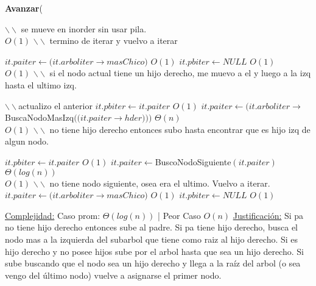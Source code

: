 \begin{algorithm}[H]{\textbf{Avanzar}(}
	\begin{algorithmic}
		\State $\backslash\backslash$ se mueve en inorder sin usar pila.
		\\

		 \Comment $O(1)$
			\State $\backslash\backslash$ termino de iterar y vuelvo a iterar

			\State $it.paiter \gets (it.arboliter$$\rightarrow$$masChico)$ \Comment $O(1)$
			\State $it.pbiter \gets NULL$ \Comment $O(1)$
			\\

		 \Comment $O(1)$
			\State $\backslash\backslash$ si el nodo actual tiene un hijo derecho, me muevo a el y luego a la izq hasta el ultimo izq.
			
			\State $\backslash\backslash$actualizo el anterior
			\State $it.pbiter \gets it.paiter$ \Comment $O(1)$
			\State $it.paiter \gets (it.arboliter$$\rightarrow$BuscaNodoMasIzq$((it.paiter$$\rightarrow$$hder)))$ \Comment $\Theta(n)$
			\\

		 \Comment $O(1)$
			\State $\backslash\backslash$ no tiene hijo derecho entonces subo hasta encontrar que es hijo izq de algun nodo.

			\State $it.pbiter \gets it.paiter$ \Comment $O(1)$
			\State $it.paiter \gets $BuscoNodoSiguiente$(it.paiter)$ \Comment $\Theta(log(n))$
			\\

			 \Comment $O(1)$
				\State $\backslash\backslash$ no tiene nodo siguiente, osea era el ultimo. Vuelvo a iterar.
				\State $it.paiter \gets (it.arboliter$$\rightarrow$$masChico)$ \Comment $O(1)$
				\State $it.pbiter \gets NULL$ \Comment $O(1)$
			\EndIf


		\EndIf

		\medskip
		\Statex \underline{Complejidad:} Caso prom: $\Theta(log(n))$ | Peor Caso $O(n)$
		\Statex \underline{Justificación:} Si pa no tiene hijo derecho entonces sube al padre. Si pa tiene hijo derecho, busca el nodo mas a la izquierda del subarbol que tiene como raiz al hijo derecho. Si es hijo derecho y no posee hijos sube por el arbol hasta que sea un hijo derecho. Si sube buscando que el nodo sea un hijo derecho y llega a la raíz del arbol (o sea vengo del último nodo) vuelve a asignarse el primer nodo.

    \end{algorithmic}
\end{algorithm}


